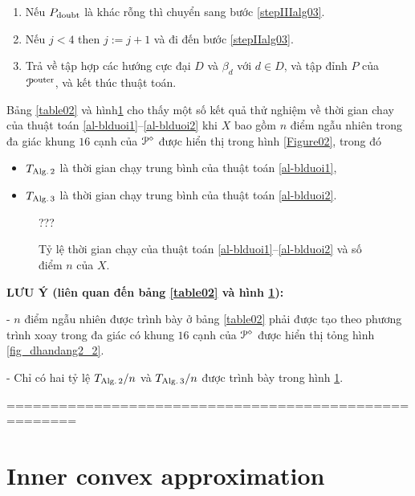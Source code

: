 \documentclass[12pt,a4paper,openany,oneside]{report}
\begin{document}
\begin{algorithm}
\begin{enumerate}
		\item\label{stepIValg03} 
		Nếu $P_{\rm doubt}$ là khác rỗng thì chuyển sang bước \ref{stepIIIalg03}.
		
		\item\label{stepValg03} 
		Nếu $j < 4$ then $j := j+1$ và đi đến bước \ref{stepIIalg03}.
		
		\item\label{stepVIalg03} 
		 Trả về tập hợp các hướng cực đại $D$ và $\beta_d$ với $d \in D$, và tập đỉnh $P$ của ${\cal P}^{\rm outer}$, và kết thúc thuật toán.
	\end{enumerate}
\end{algorithm}
\medskip
Bảng \ref{table02} và hình\ref{Figure03} cho thấy một số kết quả thử nghiệm về thời gian chay của thuật toán \ref{al-blduoi1}--\ref{al-blduoi2} khi $X$ bao gồm $n$ điểm ngẫu nhiên trong đa giác khung $16$ cạnh của ${\cal P}^\diamond$ được hiển thị trong hình \ref{Figure02}, trong đó
\begin{itemize}
	\item $T_{\rm Alg.\, 2}$ là thời gian chạy trung bình của thuật toán \ref{al-blduoi1},
	\item $T_{\rm Alg.\, 3}$ là thời gian chạy trung bình của thuật toán \ref{al-blduoi2}.
\end{itemize}


\begin{figure}[ht]
	\centering
	???
	\caption{Tỷ lệ thời gian chạy của thuật toán \ref{al-blduoi1}--\ref{al-blduoi2} và số điểm $n$ của $X$.}
	\label{Figure03}
\end{figure}


	\bigskip\noindent
	{\bf LƯU Ý (liên quan đến bảng \ref{table02} và hình \ref{Figure03}):} 
	
	- $n$ điểm ngẫu nhiên được trình bày ở bảng \ref{table02} phải được tạo theo phương trình xoay trong đa giác có khung $16$ cạnh của  ${\cal P}^\diamond$ được hiển thị tỏng hình \ref{fig_dhandang2_2}.
	
	- Chỉ có hai tỷ lệ $T_{\rm Alg.\, 2}/n$ và $T_{\rm Alg.\, 3}/n$ được trình bày trong hình \ref{Figure03}.
	
	\bigskip

======================================================





\section{Inner convex approximation}\label{InnerConvexApproximation}
\end{document}
